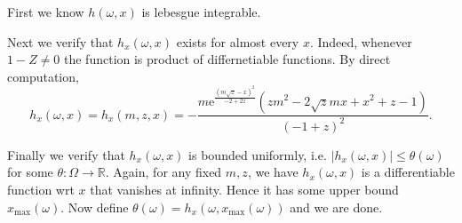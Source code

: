 First we know $h(\omega, x)$ is lebesgue integrable.

Next we verify that $h_x(\omega, x)$ exists for almost every $x$. Indeed, whenever $1-Z\neq 0$ the function is product of differnetiable functions. By direct computation,
\[
	h_x(\omega, x) = h_x(m, z, x) = -\frac{m \mathrm{e}^{\frac{(m \sqrt{z}-x)^2}{-2+2 z}}\left(z m^2-2 \sqrt{z} m x+x^2+z-1\right)}{(-1+z)^2}
.\] 

Finally we verify that $h_x(\omega, x)$ is bounded uniformly, i.e. $|h_x(\omega, x)|\le \theta(\omega)$ for some $\theta: \Omega \to  \mathbb{R}$. Again, for any fixed  $m, z$, we have $h_x(\omega, x)$ is a differentiable function wrt $x$ that vanishes at infinity. Hence it has some upper bound  $x_{\max}(\omega)$. Now define $\theta(\omega) = h_x(\omega, x_{\max}(\omega) )$ and we are done.
